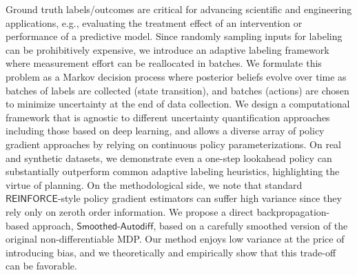 
Ground truth labels/outcomes are critical for advancing scientific and engineering applications, e.g., evaluating 
the treatment effect of an intervention or performance of a predictive model. Since randomly sampling inputs for labeling can be prohibitively expensive, we introduce an adaptive labeling framework where measurement effort can be reallocated in batches. 
We formulate this problem as a Markov decision process where
posterior beliefs evolve over time as batches of labels are collected (state transition), 
and batches (actions) are chosen to minimize uncertainty 
at the end of data collection.
We design a computational framework that is agnostic to different uncertainty quantification
approaches including those based on deep learning, and
allows a diverse array of policy gradient approaches by 
relying on continuous policy 
parameterizations.
On real and synthetic datasets, we demonstrate even a one-step lookahead policy can substantially outperform common adaptive labeling heuristics, highlighting the
virtue of planning. 
On the methodological side,
we note that standard $\mathsf{REINFORCE}$-style policy gradient estimators 
can suffer high variance since they rely only on 
zeroth order information. 
We propose a direct backpropagation-based approach, $\mathsf{Smoothed\text{-}Autodiff}$,
based on a carefully smoothed version of the original non-differentiable MDP. Our method enjoys low variance at the price of introducing bias,
and we theoretically and empirically show that this trade-off can be favorable.




